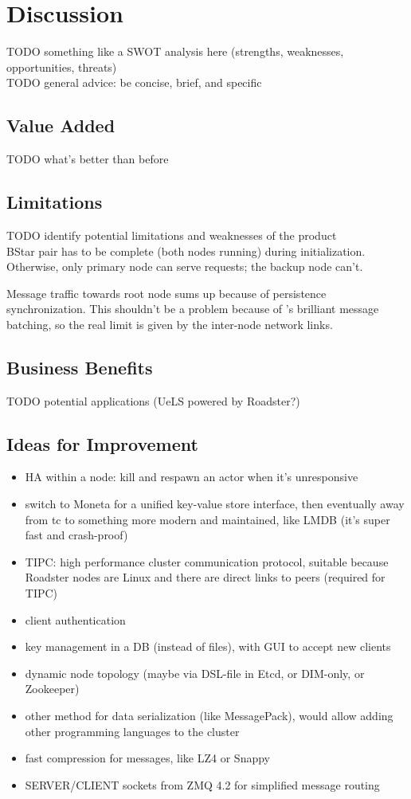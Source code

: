 \chapter{Discussion}
TODO something like a SWOT analysis here (strengths, weaknesses, opportunities, threats)\\
TODO general advice: be concise, brief, and specific\\

\section{Value Added}
TODO what's better than before\\

\section{Limitations}
TODO identify potential limitations and weaknesses of the product\\

BStar pair has to be complete (both nodes running) during initialization. Otherwise, only primary node can serve requests; the backup node can't.

Message traffic towards root node sums up because of persistence synchronization. This shouldn't be a problem because of \zmq's brilliant message batching, so the real limit is given by the inter-node network links.

\section{Business Benefits}
TODO potential applications (UeLS powered by Roadster?)\\

\section{Ideas for Improvement}
\begin{itemize}
	\item HA within a node: kill and respawn an actor when it's unresponsive
	\item switch to Moneta for a unified key-value store interface, then eventually away from \gls{tc} to something more modern and maintained, like LMDB (it's super fast and crash-proof)
	\item TIPC: high performance cluster communication protocol, suitable because Roadster nodes are Linux and there are direct links to peers (required for TIPC)
	\item client authentication
	\item key management in a DB (instead of files), with GUI to accept new clients
	\item dynamic node topology (maybe via DSL-file in Etcd, or DIM-only, or Zookeeper)
	\item other method for data serialization (like MessagePack), would allow adding other programming languages to the cluster
	\item fast compression for messages, like LZ4 or Snappy
	\item SERVER/CLIENT sockets from ZMQ 4.2 for simplified message routing
\end{itemize}
